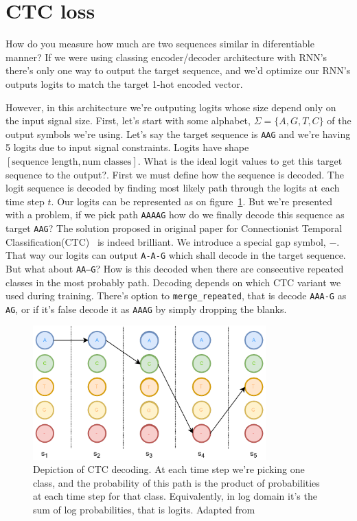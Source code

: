 \documentclass[times, utf8, diplomski, english]{fer}
\begin{document}
\section{CTC loss}
\label{sec:ctc_loss}

How do you measure how much are two sequences similar in diferentiable manner? If we were using classing encoder/decoder architecture with RNN's there's only one way to output the target sequence, and we'd optimize our RNN's outputs logits to match the target 1-hot encoded vector. 

However, in this architecture we're outputing logits whose size depend only on the input signal size. First, let's start with some alphabet, $\Sigma = \{A, G, T, C\}$ of the output symbols we're using.  
Let's say the target sequence is \texttt{AAG} and we're having 5 logits due to input signal constraints. 
Logits have shape $[\text{sequence length}, \text{num classes}]$. 
What is the ideal logit values to get this target sequence to the output?. 
First we must define how the sequence is decoded. 
The logit sequence is decoded by finding most likely path through the logits at each time step $t$. Our logits can be represented as on figure~\ref{fg:ctc_graph_0}.
But we're presented with a problem, if we pick path \texttt{AAAAG} how do we finally decode this sequence as target \texttt{AAG}? The solution proposed in original paper for Connectionist Temporal Classification(CTC)~\citep{Graves:2006:CTC:1143844.1143891, ctc-blog} is indeed brilliant. 
We introduce a special gap symbol, $-$. 
That way our logits can output \texttt{A-A-G} which shall decode in the target sequence.
But what about \texttt{AA--G}? How is this decoded when there are consecutive repeated classes in the most probably path. 
Decoding depends on which CTC variant we used during training. There's option to \texttt{merge\_repeated}, that is decode \texttt{AAA-G} as \texttt{AG}, or if it's false decode it as \texttt{AAAG} by simply dropping the blanks. 

\begin{figure}
    \begin{center}
        \includegraphics[width=0.8\textwidth]{ctc_graph_1}
        \caption{Depiction of CTC decoding. At each time step we're picking one class, and the probability of this path is the product of probabilities at each time step for that class. Equivalently, in log domain it's the sum of log probabilities, that is logits. Adapted from~\citep{mratkovic}}
        \label{fg:ctc_graph_0}
    \end{center}
\end{figure}
\end{document}
